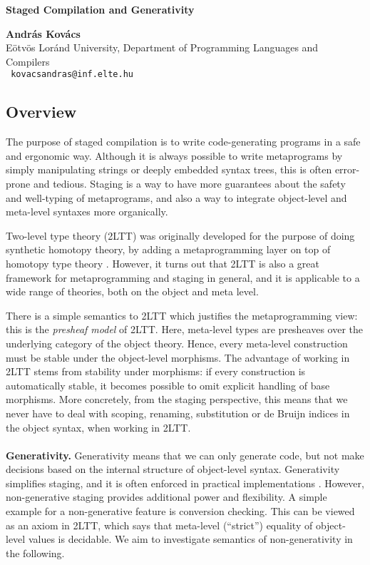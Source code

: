 \documentclass[11pt,a4paper,twoside]{article}
\begin{document}
%
%
\begin{center}{\Large\bf
Staged Compilation and Generativity
}\end{center}
%
\begin{center}{\large\bf\noindent
András Kovács
}\\[2mm]
Eötvös Loránd University, Department of Programming Languages and Compilers
\\[1mm]\texttt{
kovacsandras@inf.elte.hu
}\end{center}
%
%
\vspace*{7mm}
%
%

\subsection*{Overview}

The purpose of staged compilation is to write code-generating programs in a safe
and ergonomic way. Although it is always possible to write metaprograms by
simply manipulating strings or deeply embedded syntax trees, this is often
error-prone and tedious. Staging is a way to have more guarantees about the
safety and well-typing of metaprograms, and also a way to integrate object-level
and meta-level syntaxes more organically.

Two-level type theory (2LTT) \cite{twolevel} was originally developed for the
purpose of doing synthetic homotopy theory, by adding a metaprogramming layer on
top of homotopy type theory \cite{hottbook}. However, it turns out that 2LTT is
also a great framework for metaprogramming and staging in general, and it is
applicable to a wide range of theories, both on the object and meta level.

There is a simple semantics to 2LTT which justifies the metaprogramming view:
this is the \emph{presheaf model} of 2LTT. Here, meta-level types are presheaves
over the underlying category of the object theory. Hence, every meta-level
construction must be stable under the object-level morphisms. The advantage of
working in 2LTT stems from stability under morphisms: if every construction is
automatically stable, it becomes possible to omit explicit handling of base
morphisms. More concretely, from the staging perspective, this means that we
never have to deal with scoping, renaming, substitution or de Bruijn indices in
the object syntax, when working in 2LTT.
\\\\
\textbf{Generativity.} Generativity means that we can only generate code, but
not make decisions based on the internal structure of object-level
syntax. Generativity simplifies staging, and it is often enforced in practical
implementations \cite{kiselyov14metaocaml}. However, non-generative staging
provides additional power and flexibility. A simple example for a non-generative
feature is conversion checking. This can be viewed as an axiom in 2LTT, which
says that meta-level (``strict'') equality of object-level values is decidable.
We aim to investigate semantics of non-generativity in the following.
\end{document}
